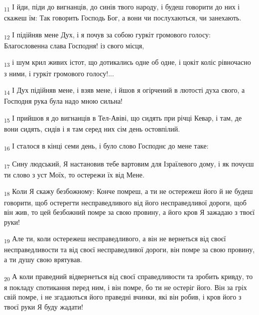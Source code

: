 \begin{tcolorbox}
\textsubscript{11} І йди, піди до вигнанців, до синів твого народу, і будеш говорити до них і скажеш їм: Так говорить Господь Бог, а вони чи послухаються, чи занехають.
\end{tcolorbox}
\begin{tcolorbox}
\textsubscript{12} І підійняв мене Дух, і я почув за собою гуркіт громового голосу: Благословенна слава Господня! із свого місця,
\end{tcolorbox}
\begin{tcolorbox}
\textsubscript{13} і шум крил живих істот, що дотикались одне об одне, і цокіт коліс рівночасно з ними, і гуркіт громового голосу!...
\end{tcolorbox}
\begin{tcolorbox}
\textsubscript{14} І Дух підійняв мене, і взяв мене, і йшов я огірчений в лютості духа свого, а Господня рука була надо мною сильна!
\end{tcolorbox}
\begin{tcolorbox}
\textsubscript{15} І прийшов я до вигнанців в Тел-Авіві, що сидять при річці Кевар, і там, де вони сидять, сидів і я там серед них сім день остовпілий.
\end{tcolorbox}
\begin{tcolorbox}
\textsubscript{16} І сталося в кінці семи день, і було слово Господнє до мене таке:
\end{tcolorbox}
\begin{tcolorbox}
\textsubscript{17} Сину людський, Я настановив тебе вартовим для Ізраїлевого дому, і як почуєш ти слово з уст Моїх, то остережи їх від Мене.
\end{tcolorbox}
\begin{tcolorbox}
\textsubscript{18} Коли Я скажу безбожному: Конче помреш, а ти не остережеш його й не будеш говорити, щоб остерегти несправедливого від його несправедливої дороги, щоб він жив, то цей безбожний помре за свою провину, а його кров Я зажадаю з твоєї руки!
\end{tcolorbox}
\begin{tcolorbox}
\textsubscript{19} Але ти, коли остережеш несправедливого, а він не вернеться від своєї несправедливости та від своєї несправедливої дороги, він помре за свою провину, а ти душу свою врятував.
\end{tcolorbox}
\begin{tcolorbox}
\textsubscript{20} А коли праведний відвернеться від своєї справедливости та зробить кривду, то я покладу спотикання перед ним, і він помре, бо ти не остеріг його. Він за гріх свій помре, і не згадаються його праведні вчинки, які він робив, і кров його з твоєї руки Я буду жадати!
\end{tcolorbox}
